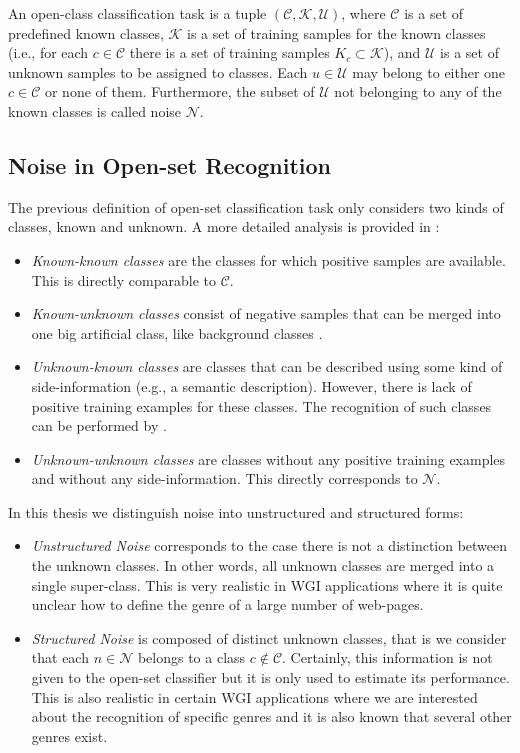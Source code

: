 An open-class classification task is a tuple $(\mathcal{C},\mathcal{K},\mathcal{U})$, where $\mathcal{C}$ is a set of predefined known classes, $\mathcal{K}$ is a set of training samples for the known classes (i.e., for each $c \in \mathcal{C}$ there is a set of training samples $K_c \subset \mathcal{K}$), and $\mathcal{U}$ is a set of unknown samples to be assigned to classes. Each $u \in \mathcal{U}$ may belong to either one $c \in \mathcal{C}$ or none of them. Furthermore, the subset of $\mathcal{U}$ not belonging to any of the known classes is called noise $\mathcal{N}$.  

\subsection{Noise in Open-set Recognition}
\label{chap:openset:sec:Noise_definition}

The previous definition of open-set classification task only considers two kinds of classes, known and unknown. A more detailed analysis is provided in \parencite{geng2018recent}:

\begin{itemize}
    \item \textit{Known-known classes} are the classes for which positive samples are available. This is directly comparable to $\mathcal{C}$.
    \item \textit{Known-unknown classes} consist of negative samples that can be merged into one big artificial class, like background classes \parencite{Dhamija:2018}.
    \item \textit{Unknown-known classes} are classes that can be described using some kind of side-information (e.g., a semantic description). However, there is lack of positive training examples for these classes. The recognition of such classes can be performed by  \parencite{palatucci2009zero}.
    \item \textit{Unknown-unknown classes} are classes without any positive training examples and without any side-information. This directly corresponds to $\mathcal{N}$. 
\end{itemize}

In this thesis we distinguish noise into unstructured and structured forms:

\begin{itemize}
    \item \textit{Unstructured Noise} corresponds to the case there is not a distinction between the unknown classes. In other words, all unknown classes are merged into a single super-class. This is very realistic in WGI applications where it is quite unclear how to define the genre of a large number of web-pages.
    \item \textit{Structured Noise} is composed of distinct unknown classes, that is we consider that each $n \in \mathcal{N}$ belongs to a class $c \notin \mathcal{C}$. Certainly, this information is not given to the open-set classifier but it is only used to estimate its performance. This is also realistic in certain WGI applications where we are interested about the recognition of specific genres and it is also known that several other genres exist.
\end{itemize}

